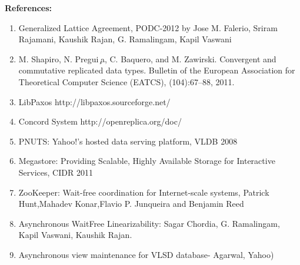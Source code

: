 \documentclass[a4paper,12pt]{report}
\begin{document}
\newpage
\textbf{References:}
\begin{enumerate}
\item Generalized Lattice Agreement, PODC-2012 by Jose M. Falerio, Sriram Rajamani, Kaushik Rajan, G. Ramalingam, Kapil Vaswani
\item M. Shapiro, N. Pregui ̧a, C. Baquero, and M. Zawirski. Convergent and commutative replicated
data types. Bulletin of the European Association for Theoretical Computer Science (EATCS), (104):67–88,
2011.
\item LibPaxos http://libpaxos.sourceforge.net/
\item Concord System http://openreplica.org/doc/
\item PNUTS: Yahoo!'s hosted data serving platform, VLDB 2008
\item Megastore: Providing Scalable, Highly Available Storage for Interactive Services, CIDR 2011
\item ZooKeeper: Wait-free coordination for Internet-scale systems, Patrick Hunt,Mahadev Konar,Flavio P. Junqueira and Benjamin Reed
\item Asynchronous WaitFree Linearizability: Sagar Chordia, G. Ramalingam, Kapil Vaswani, Kaushik Rajan.
\item Asynchronous view maintenance for VLSD database- Agarwal, Yahoo)
\end{enumerate}
\end{document}
